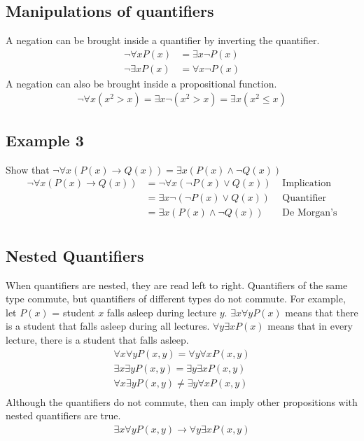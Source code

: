 \documentclass{article}
\theoremstyle{mytheoremstyle}
\theoremstyle{mytheoremstyle}
\theoremstyle{myproblemstyle}
\begin{document}
    \subsection*{Manipulations of quantifiers}
    A negation can be brought inside a quantifier by inverting the quantifier.
    \begin{align*}
        \neg \forall x P(x) &= \exists x \neg P(x) \\
        \neg \exists x P(x) &= \forall x \neg P(x)
    \end{align*}
    A negation can also be brought inside a propositional function.
    \begin{align*}
        \neg \forall x (x^2>x) = \exists x \neg (x^2>x) = \exists x (x^2 \le x)
    \end{align*}

    \subsection*{Example 3}
    Show that
    $\neg \forall x (P(x) \rightarrow Q(x)) = \exists x (P(x) \wedge \neg Q(x))$
    \begin{align*}
        \neg \forall x (P(x) \rightarrow Q(x))
        &= \neg \forall x (\neg P(x) \vee Q(x)) & \text{ Implication}\\
        &= \exists x \neg (\neg P(x) \vee Q(x)) & \text{ Quantifier}\\
        &= \exists x (P(x) \wedge \neg Q(x)) & \text{ De Morgan's}\\
    \end{align*}

    \subsection*{Nested Quantifiers}
    When quantifiers are nested, they are read left to right. Quantifiers of the
    same type commute, but quantifiers of different types do not commute. For
    example, let $P(x)$ = student $x$ falls asleep during lecture $y$. $\exists
    x \forall y P(x)$ means that there is a student that falls asleep during all
    lectures. $\forall y \exists x P(x)$ means that in every lecture, there is a
    student that falls asleep.
    \begin{align*}
        \forall x \forall y P(x,y) = \forall y \forall x P(x,y) \\
        \exists x \exists y P(x,y) = \exists y \exists x P(x,y) \\
        \forall x \exists y P(x,y) \ne \exists y \forall x P(x,y) \\
    \end{align*}
    Although the quantifiers do not commute, then can imply other propositions
    with nested quantifiers are true.
    \begin{align*}
        \exists x \forall y P(x,y) \rightarrow \forall y \exists x P(x,y)
    \end{align*}
\end{document}
